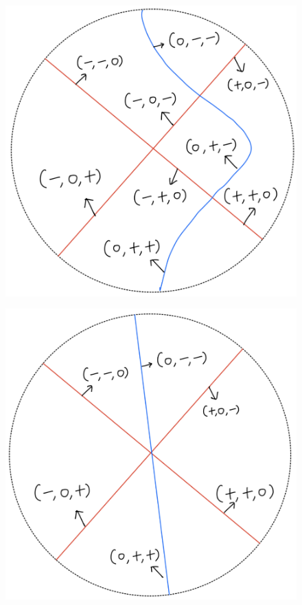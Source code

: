 \begin{definition}
\begin{enumerate}
\begin{itemize}
\begin{figure}[H]
    \centering
    \includegraphics[scale = 0.95]{diagrams/lemma4/10.png}
    \caption{}
    \label{fig:your-label}
\end{figure}
\begin{figure}[H]
    \centering
    \includegraphics[scale = 0.95]{diagrams/lemma4/11.png}

\end{figure}
\end{itemize}
\end{enumerate}
\end{definition}

